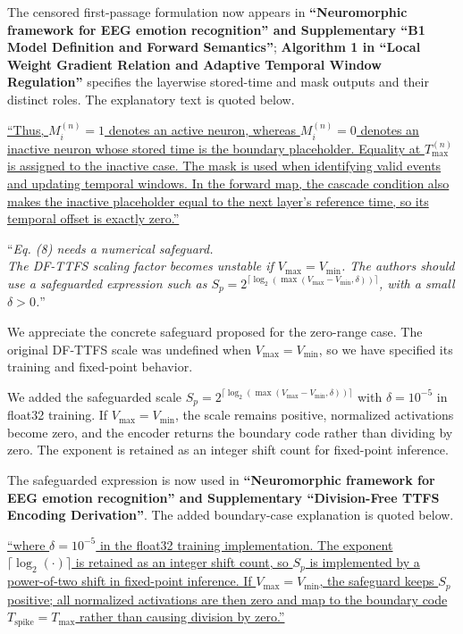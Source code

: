 \documentclass[12pt,technote,onecolumn]{IEEEtran}
\begin{document}
The censored first-passage formulation now appears in \textbf{``Neuromorphic framework for EEG emotion recognition'' and Supplementary ``B1 Model Definition and Forward Semantics''}; \textbf{Algorithm 1 in ``Local Weight Gradient Relation and Adaptive Temporal Window Regulation''} specifies the layerwise stored-time and mask outputs and their distinct roles. The explanatory text is quoted below.

\uline{``Thus, $M_i^{(n)}=1$ denotes an active neuron, whereas $M_i^{(n)}=0$ denotes an inactive neuron whose stored time is the boundary placeholder. Equality at $T_{\max}^{(n)}$ is assigned to the inactive case. The mask is used when identifying valid events and updating temporal windows. In the forward map, the cascade condition also makes the inactive placeholder equal to the next layer's reference time, so its temporal offset is exactly zero.''}

\vspace{4mm}

``{\it Eq. (8) needs a numerical safeguard.\\
The DF-TTFS scaling factor becomes unstable if \(V_{\max} = V_{\min}\). The authors should use a safeguarded expression such as \(S_p = 2^{\lceil \log_2(\max(V_{\max} - V_{\min}, \delta)) \rceil}\), with a small \(\delta > 0\).}''
\vspace{1mm}


We appreciate the concrete safeguard proposed for the zero-range case. The original DF-TTFS scale was undefined when \(V_{\max}=V_{\min}\), so we have specified its training and fixed-point behavior.

We added the safeguarded scale
\(S_p=2^{\lceil\log_2(\max(V_{\max}-V_{\min},\delta))\rceil}\) with
\(\delta=10^{-5}\) in float32 training. If \(V_{\max}=V_{\min}\), the
scale remains positive, normalized activations become zero, and the
encoder returns the boundary code rather than dividing by zero. The
exponent is retained as an integer shift count for fixed-point
inference.



The safeguarded expression is now used in \textbf{``Neuromorphic framework for EEG emotion recognition'' and Supplementary ``Division-Free TTFS Encoding Derivation''}. The added boundary-case explanation is quoted below.

\uline{``where $\delta=10^{-5}$ in the float32 training implementation. The exponent $\lceil\log_2(\cdot)\rceil$ is retained as an integer shift count, so $S_p$ is implemented by a power-of-two shift in fixed-point inference. If $V_{\max}=V_{\min}$, the safeguard keeps $S_p$ positive; all normalized activations are then zero and map to the boundary code $T_{\mathrm{spike}}=T_{\max}$ rather than causing division by zero.''}
\end{document}
